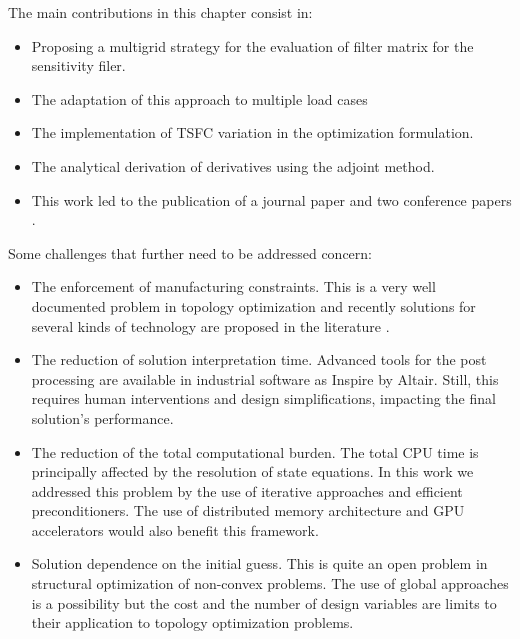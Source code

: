 The main contributions in this chapter consist in:
\begin{itemize}
\item Proposing a multigrid strategy for the evaluation of filter matrix for the sensitivity filer. 
\item The adaptation of this approach to multiple load cases
\item The implementation of TSFC variation in the optimization formulation.
\item The analytical derivation of derivatives using the adjoint method.
\item This work led to the publication of a journal paper \cite{coniglio2019enginepylon} and two conference papers \cite{coniglio2017pylon,coniglio2018original}.
\end{itemize}
Some challenges that further need to be addressed concern:
\begin{itemize}
\item The enforcement of manufacturing constraints. This is a very well documented problem in topology optimization and recently solutions for several kinds of technology are proposed in the literature \cite{liu_current_2018}.
\item The reduction of solution interpretation time. Advanced tools for the post processing are available in industrial software as Inspire by Altair. Still, this requires human interventions and design simplifications, impacting the final solution's performance.  
\item The reduction of the total computational burden. The total CPU time is principally affected by the resolution of state equations. In this work we addressed this problem by the use of iterative approaches and efficient preconditioners. The use of distributed memory architecture \cite{aage2017giga} and GPU accelerators \cite{wadbro2009megapixel} would also benefit this framework.
\item Solution dependence on the initial guess. This is quite an open problem in structural optimization of non-convex problems. The use of global approaches \cite{simon2013evolutionary} is a possibility but the cost and the number of design variables are limits to their application to topology optimization problems.
\end{itemize}

